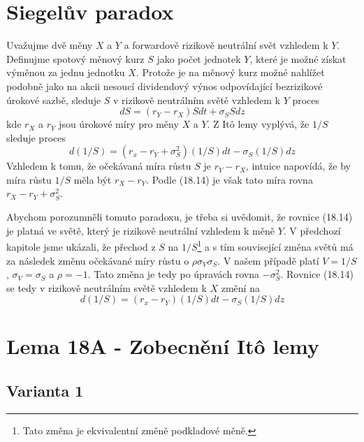 \documentclass[a4paper]{book}
\begin{document}
\section{Siegelův paradox}

Uvažujme dvě měny $X$ a $Y$ a forwardově rizikově neutrální svět vzhledem k $Y$. Definujme spotový měnový kurz $S$ jako počet jednotek $Y$, které je možné získat výměnou za jednu jednotku $X$. Protože je na měnový kurz možné nahlížet podobně jako na akcii nesoucí dividendový výnos odpovídající bezrizikové úrokové sazbě, sleduje $S$ v rizikově neutrálním světě vzhledem k $Y$ proces
\begin{equation*}
dS = (r_Y - r_X)S dt + \sigma_S S dz
\end{equation*}
kde $r_X$ a $r_Y$ jsou úrokové míry pro měny $X$ a $Y$. Z It\^o lemy vyplývá, že $1/S$ sleduje proces
\begin{equation}
d(1/S) = (r_x - r_Y + \sigma^2_S)(1/S)dt - \sigma_S(1/S)dz
\end{equation}
Vzhledem k tomu, že očekávaná míra růstu $S$ je $r_Y - r_X$, intuice napovídá, že by míra růstu $1/S$ měla být $r_X - r_Y$. Podle (18.14) je však tato míra rovna $r_X - r_Y + \sigma^2_S$.

Abychom porozumněli tomuto paradoxu, je třeba si uvědomit, že rovnice (18.14) je platná ve světě, který je rizikově neutrální vzhledem k měně $Y$. V předchozí kapitole jsme ukázali, že přechod z $S$ na $1/S$\footnote{Tato změna je ekvivalentní změně podkladové měně.} a s tím související změna světů má za následek změnu očekávané míry růstu o $\rho \sigma_V \sigma_S$. V našem případě platí $V = 1/S$, $\sigma_V = \sigma_S$ a $\rho = -1$. Tato změna je tedy po úpravách rovna $-\sigma^2_S$. Rovnice (18.14) se tedy v rizikově neutrálním světě vzhledem k $X$ změní na
\begin{equation*}
d(1/S) = (r_x - r_Y)(1/S)dt - \sigma_S(1/S)dz
\end{equation*}

\section{Lema 18A - Zobecnění It\^o lemy} 

\subsection{Varianta 1}
\end{document}
